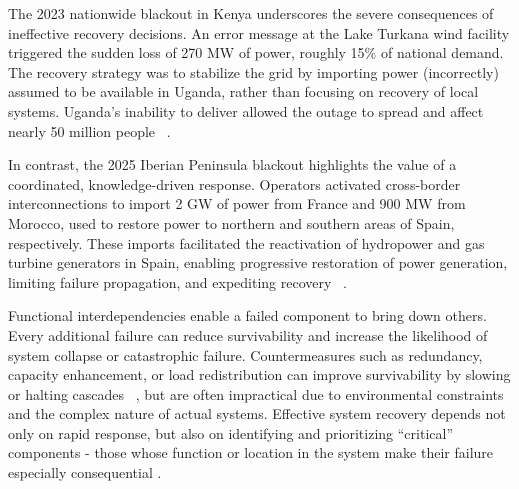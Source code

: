 \documentclass[conference]{IEEEtran}
\begin{document}


The 2023 nationwide blackout in Kenya underscores the severe consequences of ineffective recovery decisions. An error message at the Lake Turkana wind facility triggered the sudden loss of 270 MW of power, roughly 15\% of national demand. The recovery strategy was to stabilize the grid by importing power (incorrectly) assumed to be available in Uganda, rather than focusing on recovery of local systems. Uganda's inability to deliver allowed the outage to spread and affect nearly 50 million people ~\cite{apkenya_aug23, mwangi_kenya_2023}. 

In contrast, the 2025 Iberian Peninsula blackout highlights the value of a coordinated, knowledge-driven response. Operators activated cross-border interconnections to import 2 GW of power from  France and 900 MW from Morocco, used to restore power to northern and southern areas of Spain, respectively. These  imports facilitated the reactivation of hydropower and gas turbine generators in Spain, enabling progressive restoration of power generation, limiting failure propagation, and expediting recovery ~\cite{cetinkaya_technical_2025}. 

Functional interdependencies enable a failed component to bring down others. Every additional failure can reduce survivability and increase the likelihood of system collapse or catastrophic failure. Countermeasures such as redundancy, capacity enhancement, or load redistribution can improve survivability by slowing or halting cascades ~\cite{zhang_effects_2017}, but are often impractical due to environmental constraints and the complex nature of actual systems. Effective system recovery depends not only on rapid response, but also on identifying and prioritizing ``critical'' components - those whose function or location in the system make their failure especially consequential \cite{marashi_identification_2021}. 
\end{document}
